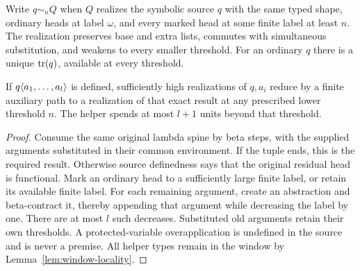 Write $q\sim_n Q$ when $Q$ realizes the symbolic source $q$ with the
same typed shape, ordinary heads at label $\omega$, and every marked
head at some finite label at least $n$. The realization preserves base
and extra lists, commutes with simultaneous substitution, and weakens
to every smaller threshold. For an ordinary $q$ there is a unique
$\operatorname{tr}(q)$, available at every threshold.

\begin{lemma}\label{lem:tuple-simulation}
If $q\langle a_1,\ldots,a_l\rangle$ is defined, sufficiently high realizations
of $q,a_i$ reduce by a finite auxiliary path to a realization of that
exact result at any prescribed lower threshold $n$. The helper spends
at most $l+1$ units beyond that threshold.
\end{lemma}
\begin{proof}
Consume the same original lambda spine by beta steps, with the supplied
arguments substituted in their common environment. If the tuple ends,
this is the required result. Otherwise source definedness says that
the original residual head is functional. Mark an ordinary head to
a sufficiently large finite label, or retain its available finite
label. For each remaining argument, create an abstraction and
beta-contract it, thereby appending that argument while decreasing
the label by one. There are at most $l$ such decreases. Substituted
old arguments retain their own thresholds. A protected-variable
overapplication is undefined in the source and is never a premise.
All helper types remain in the window by Lemma~\ref{lem:window-locality}.
\end{proof}

